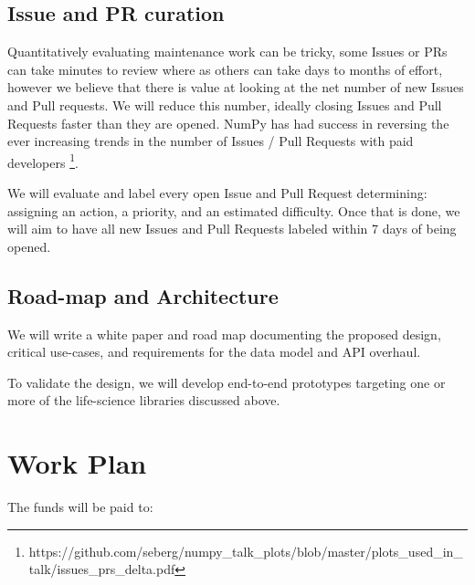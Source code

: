\documentclass[11pt]{article}  %
\begin{document}
\subsection{Issue and PR curation}

Quantitatively evaluating maintenance work can be tricky, some Issues
or PRs can take minutes to review where as others can take days to
months of effort, however we believe that there is value at looking at
the net number of new Issues and Pull requests.  We will reduce this
number, ideally closing Issues and Pull Requests faster than they are
opened.  NumPy has had success in reversing the ever increasing trends
in the number of Issues / Pull Requests with paid
developers \footnote{https://github.com/seberg/numpy\_talk\_plots/blob/master/plots\_used\_in\_talk/issues\_prs\_delta.pdf}.


We will evaluate and label every open Issue and Pull Request
determining: assigning an action, a priority, and an estimated
difficulty.  Once that is done, we will aim to have all new Issues and
Pull Requests labeled within 7 days of being opened.


\subsection{Road-map and Architecture}

We will write a white paper and road map documenting the proposed
design, critical use-cases, and requirements for the data model and
API overhaul.

To validate the design, we will develop end-to-end prototypes
targeting one or more of the life-science libraries discussed above.


\section{Work Plan}

The funds will be paid to:
\end{document}
